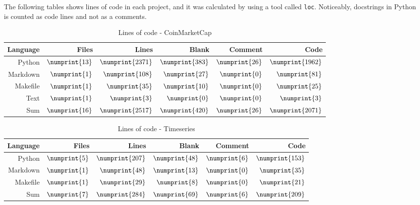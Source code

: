 The following tables shows lines of code in each project, and it was calculated by using a tool called \texttt{loc}. Noticeably, docstrings in Python is counted as code lines and not as a comments.

\begin{table}[ht]
        \centering
        \begin{tabularx}{\textwidth}{ |R|R|R|R|R|R| }\hline
        Language    & Files             & Lines             & Blank             & Comment           & Code              \\\hline
        Python      & $\numprint{13}$   & $\numprint{2371}$ & $\numprint{383}$  & $\numprint{26}$   & $\numprint{1962}$ \\
        Markdown    & $\numprint{1}$    & $\numprint{108}$  & $\numprint{27}$   & $\numprint{0}$    & $\numprint{81}$   \\
        Makefile    & $\numprint{1}$    & $\numprint{35}$   & $\numprint{10}$   & $\numprint{0}$    & $\numprint{25}$   \\
        Text        & $\numprint{1}$    & $\numprint{3}$    & $\numprint{0}$    & $\numprint{0}$    & $\numprint{3}$    \\\hline
        Sum         & $\numprint{16}$   & $\numprint{2517}$ & $\numprint{420}$  & $\numprint{26}$   & $\numprint{2071}$ \\\hline
        \end{tabularx}
        \caption{Lines of code - CoinMarketCap}
        \label{tab:cloc_coin}
\end{table}

\begin{table}[ht]
        \centering
        \begin{tabularx}{\textwidth}{ |R|R|R|R|R|R| }\hline
        Language    & Files             & Lines             & Blank             & Comment           & Code              \\\hline
        Python      & $\numprint{5}$    & $\numprint{207}$  & $\numprint{48}$   & $\numprint{6}$    & $\numprint{153}$  \\
        Markdown    & $\numprint{1}$    & $\numprint{48}$   & $\numprint{13}$   & $\numprint{0}$    & $\numprint{35}$   \\
        Makefile    & $\numprint{1}$    & $\numprint{29}$   & $\numprint{8}$    & $\numprint{0}$    & $\numprint{21}$   \\\hline
        Sum         & $\numprint{7}$    & $\numprint{284}$  & $\numprint{69}$   & $\numprint{6}$    & $\numprint{209}$  \\\hline
        \end{tabularx}
        \caption{Lines of code - Timeseries}
        \label{tab:cloc_timeseries}
\end{table}

